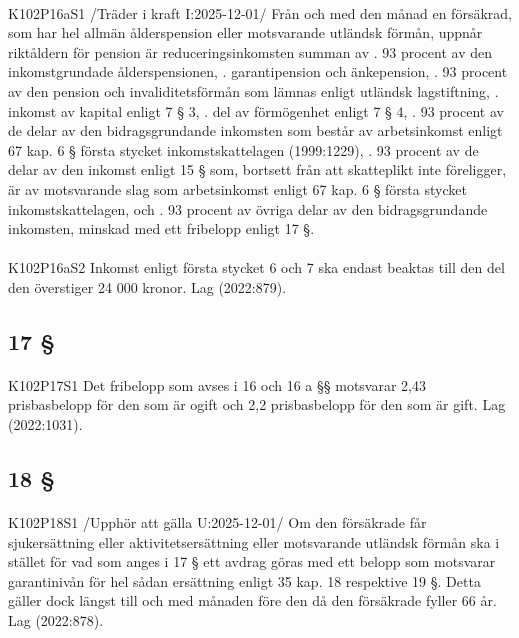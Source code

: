 \documentclass[a4paper,notitlepage,openany,10pt]{book}
\begin{document}
\paragraph*{}
{\tiny K102P16aS1}
/Träder i kraft I:2025-12-01/
Från och med den månad en försäkrad, som har hel allmän ålderspension eller motsvarande utländsk förmån, uppnår riktåldern för pension är reduceringsinkomsten summan av
. 93 procent av den inkomstgrundade ålderspensionen,
. garantipension och änkepension,
. 93 procent av den pension och invaliditetsförmån som lämnas enligt utländsk lagstiftning,
. inkomst av kapital enligt 7 § 3,
. del av förmögenhet enligt 7 § 4,
. 93 procent av de delar av den bidragsgrundande inkomsten som består av arbetsinkomst enligt 67 kap. 6 § första stycket inkomstskattelagen (1999:1229),
. 93 procent av de delar av den inkomst enligt 15 § som, bortsett från att skatteplikt inte föreligger, är av motsvarande slag som arbetsinkomst enligt 67 kap. 6 § första stycket inkomstskattelagen, och
. 93 procent av övriga delar av den bidragsgrundande inkomsten, minskad med ett fribelopp enligt 17 §.
\paragraph*{}
{\tiny K102P16aS2}
Inkomst enligt första stycket 6 och 7 ska endast beaktas till den del den överstiger 24 000 kronor.
Lag (2022:879).
\subsection*{17 §}
\paragraph*{}
{\tiny K102P17S1}
Det fribelopp som avses i 16 och 16 a §§ motsvarar 2,43 prisbasbelopp för den som är ogift och 2,2 prisbasbelopp för den som är gift.
Lag (2022:1031).
\subsection*{18 §}
\paragraph*{}
{\tiny K102P18S1}
/Upphör att gälla U:2025-12-01/
Om den försäkrade får sjukersättning eller aktivitetsersättning eller motsvarande utländsk förmån ska i stället för vad som anges i 17 § ett avdrag göras med ett belopp som motsvarar garantinivån för hel sådan ersättning enligt 35 kap. 18 respektive 19 §. Detta gäller dock längst till och med månaden före den då den försäkrade fyller 66 år.
Lag (2022:878).
\end{document}
